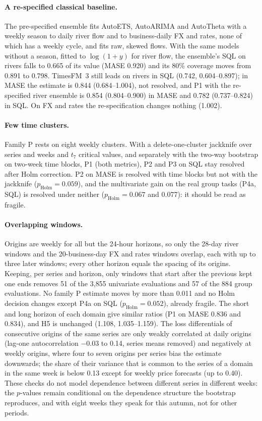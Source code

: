 \paragraph{A re-specified classical baseline.} The pre-specified ensemble fits AutoETS, AutoARIMA and AutoTheta with a weekly
season to daily river flow and to business-daily FX and rates, none of which has a weekly cycle, and fits raw, skewed flows. With
the same models without a season, fitted to $\log(1+y)$ for river flow, the ensemble's SQL on rivers falls to 0.665 of its value
(MASE 0.920) and its 80\% coverage moves from 0.891 to 0.798. TimesFM~3 still leads on rivers in SQL (0.742, 0.604--0.897); in MASE the estimate is 0.844 (0.684--1.004), not resolved, and P1 with the re-specified river ensemble is 0.854 (0.804--0.900) in MASE and 0.782 (0.737--0.824) in SQL. On FX and
rates the re-specification changes nothing (1.002).

\paragraph{Few time clusters.} Family P rests on eight weekly clusters. With a delete-one-cluster jackknife over series and weeks
and $t_7$ critical values, and separately with the two-way bootstrap on two-week time blocks, P1 (both metrics), P2 and P3 on SQL
stay resolved after Holm correction. P2 on MASE is resolved with time blocks but not with the jackknife ($p_{\mathrm{Holm}} =
0.059$), and the multivariate gain on the real group tasks (P4a, SQL) is resolved under neither ($p_{\mathrm{Holm}} = 0.067$ and
0.077): it should be read as fragile.

\paragraph{Overlapping windows.} Origins are weekly for all but the 24-hour horizons, so only the 28-day river windows and the
20-business-day FX and rates windows overlap, each with up to three later windows; every other horizon equals the spacing of its
origins. Keeping, per series and horizon, only windows that start after the previous kept one ends removes 51 of the 3{,}855
univariate evaluations and 57 of the 884 group evaluations. No family P estimate moves by more than 0.011 and no Holm decision
changes except P4a on SQL ($p_{\mathrm{Holm}} = 0.052$), already fragile. The short and long horizon of each domain give similar
ratios (P1 on MASE 0.836 and 0.834), and H5 is unchanged (1.108, 1.035--1.159). The loss differentials of consecutive origins of the
same series are only weakly correlated at daily origins (lag-one autocorrelation $-0.03$ to 0.14, series means removed) and negatively
at weekly origins, where four to seven origins per series bias the estimate downwards; the share of their variance that is common to
the series of a domain in the same week is below 0.13 except for weekly price forecasts (up to 0.40). These checks do not model
dependence between different series in different weeks: the $p$-values remain conditional on the dependence structure the bootstrap
reproduces, and with eight weeks they speak for this autumn, not for other periods.

